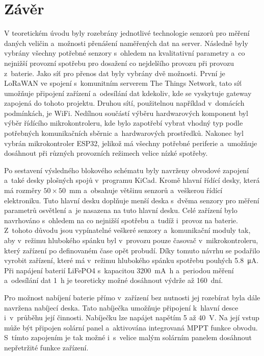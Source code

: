 \chapter*{Závěr}
{}

V teoretickém úvodu byly rozebrány jednotlivé technologie senzorů pro měření daných veličin a~možnosti přenášení naměřených dat na server. Následně byly vybrány všechny potřebné senzory s~ohledem na kvalitativní parametry a~co nejnižší provozní spotřebu pro dosažení co nejdelšího provozu při provozu z~baterie. Jako síť pro přenos dat byly vybrány dvě možnosti. První je LoRaWAN ve spojení s~komunitním serverem The Things Network, tato síť umožňuje připojení zařízení a~odesílání dat kdekoliv, kde se vyskytuje gateway zapojená do tohoto projektu. Druhou sítí, použitelnou například v~domácích podmínkách, je WiFi. Nedílnou součástí výběru hardwarových komponent byl výběr řídícího mikrokontroleru, kde bylo zapotřebí vybrat vhodný typ podle potřebných komunikačních sběrnic a~hardwarových prostředků. Nakonec byl vybrán mikrokontroler ESP32, jelikož má všechny potřebné periferie a~umožňuje dosáhnout při různých provozních režimech velice nízké spotřeby.

Po sestavení výsledného blokového schématu byly navrženy obvodové zapojení a~také desky plošných spojů v~programu KiCad. Kromě hlavní řídící desky, která má rozměry $50 \times 50$\SI{}{\milli\metre} a~obsahuje většinu senzorů a~veškerou řídící elektroniku. Tuto hlavní desku doplňuje menší deska s~dvěma senzory pro měření parametrů osvětlení a~je nasazena na tuto hlavní desku. Celé zařízení bylo navrhováno s~ohledem na co nejnižší spotřebu a~tudíž i~provoz na baterie. Z~tohoto důvodu jsou vypínatelné veškeré senzory a~komunikační moduly tak, aby v~režimu hlubokého spánku byl v~provozu pouze časovač v~mikrokontroleru, který zařízení po definovaném čase opět probudí. Díky tomuto návrhu se podařilo vyrobit zařízení, které má v~režimu hlubokého spánku spotřebu pouhých \SI{5.8}{\micro\ampere}. Při napájení baterií LiFePO4 s~kapacitou \SI{3200}{\milli\ampere\hour} a~periodou měření a~odesílání dat \SI{1}{\hour} je teoreticky možné dosáhnout výdrže až 160~dní.

Pro možnost nabíjení baterie přímo v~zařízení bez nutnosti jej rozebírat byla dále navržena nabíjecí deska. Tato nabíječka umožňuje připojení k~hlavní desce i~v~průběhu její činnosti. Nabíječku lze napájet napětím \SI{5}{} až \SI{40}{\volt}. Na její vstup může být připojen solární panel a~aktivována integrovaná MPPT funkce obvodu. S~tímto zapojením je tak možné i~s~velice malým solárním panelem dosáhnout nepřetržité funkce zařízení.

